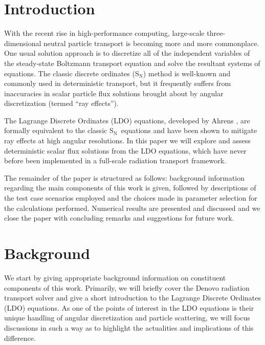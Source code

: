 \documentclass{article} %
\newcommand{\sn}{S$_\mathrm{N}$}
\begin{document}
\begin{abstract}
{
abstract

Keywords: x; y; z
}
\end{abstract}

\pagebreak

\section{Introduction}
\label{sec:intro}

With the recent rise in high-performance computing, large-scale 
three-dimensional neutral particle transport is becoming more and more
commonplace. One usual solution approach is to discretize all of the
independent variables of the steady-state Boltzmann transport equation and
solve the resultant systems of equations. The classic discrete ordinates (\sn)
method is well-known and commonly used in deterministic transport, but it
frequently suffers from inaccuracies in scalar particle flux solutions
brought about by angular discretization (termed ``ray effects'').

The Lagrange Discrete Ordinates (LDO) equations, developed by Ahrens
\cite{ahrens}, are formally equivalent to the classic \sn\ equations and have
been shown to mitigate ray effects at high angular resolutions.
In this paper we will explore and assess deterministic scalar flux solutions
from the LDO equations, which have never before
been implemented in a full-scale radiation transport framework.

The remainder of the paper is structured as follows: background information
regarding the main components of this work is given, followed by descriptions
of the test case scenarios employed and the choices made in parameter selection
for the calculations performed. Numerical results are presented and discussed
and we close the paper with concluding remarks and suggestions for future work.

\section{Background}
\label{sec:background}

We start by giving appropriate background information on constituent components
of this work. Primarily, we will briefly cover the Denovo radiation transport
solver and give a short introduction to the Lagrange Discrete Ordinates (LDO)
equations. As one of the points of interest in the LDO equations is their
unique handling of angular discretization and particle scattering, we will
focus discussions in such a way as to highlight the actualities and
implications of this difference.
\end{document}
